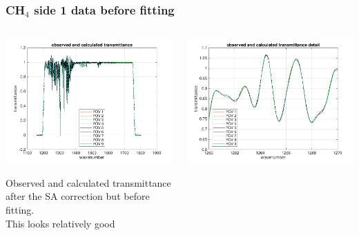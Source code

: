 \documentclass[10pt]{beamer}
\begin{document}
\begin{frame}
\frametitle{CH$_4$ side 1 data before fitting}
\begin{columns}[t]
\begin{column}{0.5\textwidth}  
  \begin{centering}
  \includegraphics[width=\textwidth]{01-13_pfh_s1_CH4/spec_test2_all.png}
  \end{centering}\vspace{3mm}

Observed and calculated transmittance after the SA correction but
before fitting.  \\ This looks relatively good

\end{column}

\begin{column}{0.5\textwidth}
  \begin{centering}
  \includegraphics[width=\textwidth]{01-13_pfh_s1_CH4/spec_test2_zoom.png}
  \end{centering}\vspace{3mm}


\end{column}
\end{columns}
\end{frame}
\end{document}
